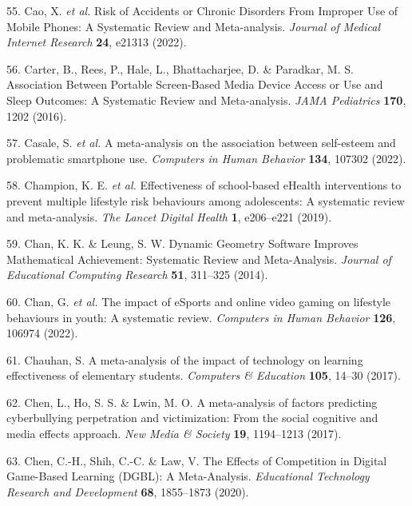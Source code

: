 \documentclass[
  english,
  man]{apa6}
\newenvironment{cslreferences}%
  {}%
  {\par}
\begin{document}
\begin{cslreferences}
\leavevmode\hypertarget{ref-caoRiskAccidentsChronic2022}{}%
55. Cao, X. \emph{et al.} Risk of Accidents or Chronic Disorders From Improper Use of Mobile Phones: A Systematic Review and Meta-analysis. \emph{Journal of Medical Internet Research} \textbf{24}, e21313 (2022).

\leavevmode\hypertarget{ref-carterAssociationPortableScreenbased2016}{}%
56. Carter, B., Rees, P., Hale, L., Bhattacharjee, D. \& Paradkar, M. S. Association Between Portable Screen-Based Media Device Access or Use and Sleep Outcomes: A Systematic Review and Meta-analysis. \emph{JAMA Pediatrics} \textbf{170}, 1202 (2016).

\leavevmode\hypertarget{ref-casaleMetaanalysisAssociationSelfesteem2022}{}%
57. Casale, S. \emph{et al.} A meta-analysis on the association between self-esteem and problematic smartphone use. \emph{Computers in Human Behavior} \textbf{134}, 107302 (2022).

\leavevmode\hypertarget{ref-championEffectivenessSchoolbasedEHealth2019}{}%
58. Champion, K. E. \emph{et al.} Effectiveness of school-based eHealth interventions to prevent multiple lifestyle risk behaviours among adolescents: A systematic review and meta-analysis. \emph{The Lancet Digital Health} \textbf{1}, e206--e221 (2019).

\leavevmode\hypertarget{ref-chanDynamicGeometrySoftware2014}{}%
59. Chan, K. K. \& Leung, S. W. Dynamic Geometry Software Improves Mathematical Achievement: Systematic Review and Meta-Analysis. \emph{Journal of Educational Computing Research} \textbf{51}, 311--325 (2014).

\leavevmode\hypertarget{ref-chanImpactESportsOnline2022}{}%
60. Chan, G. \emph{et al.} The impact of eSports and online video gaming on lifestyle behaviours in youth: A systematic review. \emph{Computers in Human Behavior} \textbf{126}, 106974 (2022).

\leavevmode\hypertarget{ref-chauhanMetaanalysisImpactTechnology2017}{}%
61. Chauhan, S. A meta-analysis of the impact of technology on learning effectiveness of elementary students. \emph{Computers \& Education} \textbf{105}, 14--30 (2017).

\leavevmode\hypertarget{ref-chenMetaanalysisFactorsPredicting2017}{}%
62. Chen, L., Ho, S. S. \& Lwin, M. O. A meta-analysis of factors predicting cyberbullying perpetration and victimization: From the social cognitive and media effects approach. \emph{New Media \& Society} \textbf{19}, 1194--1213 (2017).

\leavevmode\hypertarget{ref-chenEffectsCompetitionDigital2020}{}%
63. Chen, C.-H., Shih, C.-C. \& Law, V. The Effects of Competition in Digital Game-Based Learning (DGBL): A Meta-Analysis. \emph{Educational Technology Research and Development} \textbf{68}, 1855--1873 (2020).


\end{cslreferences}
\end{document}
